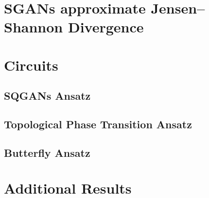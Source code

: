 \chapter{SGANs approximate Jensen–Shannon Divergence}

\label{apx:JSD}



\let\oldclearpage\clearpage
\let\clearpage\relax
\chapter{Circuits}
\section{SQGANs Ansatz}
\label{apx:sqgans_ansatz}


\section{Topological Phase Transition Ansatz}
\label{apx:topological_phase_transition_ansatz}

\section{Butterfly Ansatz}
\label{apx:butterfly_ansatz}

\chapter{Additional Results}
